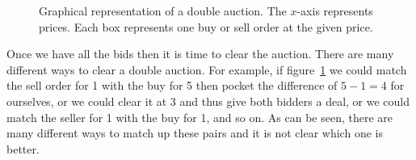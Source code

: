 \begin{figure}
  \begin{minipage}{1.0\linewidth}
    \begin{center}
    \end{center}
  \end{minipage}
  \caption{Graphical representation of a double auction. The
    $x$-axis represents prices. Each box represents one buy or sell
    order at the given price.}
  \label{fig:double}
\end{figure}

Once we have all the bids then it is time to clear the auction.  There
are many different ways to clear a double auction. For example, if
figure~\ref{fig:double} we could match the sell order for 1 with the
buy for 5 then pocket the difference of $5 - 1 = 4$ for ourselves, or
we could clear it at 3 and thus give both bidders a deal, or we could
match the seller for 1 with the buy for 1, and so on. As can be seen,
there are many different ways to match up these pairs and it is not
clear which one is better.

